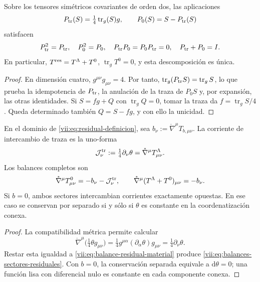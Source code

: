 \begin{proposition}
\label{vii:prop:proyectores-traza-residual}
Sobre los tensores simétricos covariantes de orden dos, las aplicaciones
\[
 P_{\rm tr}(S)=\tfrac14\operatorname{tr}_g(S)g,
 \qquad P_0(S)=S-P_{\rm tr}(S)
\]
satisfacen
\begin{equation}
 P_{\rm tr}^2=P_{\rm tr},\quad P_0^2=P_0,\quad
 P_{\rm tr}P_0=P_0P_{\rm tr}=0,\quad P_{\rm tr}+P_0=I.
 \label{vii:eq:proyectores-traza-residual}
\end{equation}
En particular, \(T^{\rm res}=T^\Lambda+T^0\),
\(\operatorname{tr}_gT^0=0\), y esta descomposición es única.
\end{proposition}
\begin{proof}
En dimensión cuatro, \(g^{\mu\nu}g_{\mu\nu}=4\). Por tanto,
\(\operatorname{tr}_g(P_{\rm tr}S)=\operatorname{tr}_gS\), lo que
prueba la idempotencia de \(P_{\rm tr}\), la anulación de la traza
de \(P_0S\) y, por expansión, las otras identidades.
Si \(S=fg+Q\) con \(\operatorname{tr}_gQ=0\), tomar la traza
da \(f=\operatorname{tr}_gS/4\). Queda determinado también
\(Q=S-fg\), y con ello la unicidad.
\end{proof}

\begin{theorem}
\label{vii:thm:intercambio-traza-residual}
En el dominio de \eqref{vii:eq:residual-definicion}, sea
\(b_\nu:=\mathring\nabla^\mu T_{b,\mu\nu}\). La corriente
de intercambio de traza es la uno-forma
\begin{equation}
 \mathcal J^{\rm tr}_\nu
 :=\tfrac14\partial_\nu\theta
 =\mathring\nabla^\mu T^\Lambda_{\mu\nu}.
 \label{vii:eq:corriente-intercambio-traza}
\end{equation}
Los balances completos son
\begin{equation}
 \mathring\nabla^\mu T^0_{\mu\nu}
       =-b_\nu-\mathcal J^{\rm tr}_\nu,
 \qquad
 \mathring\nabla^\mu(T^\Lambda+T^0)_{\mu\nu}=-b_\nu.
 \label{vii:eq:balances-sectores-residuales}
\end{equation}
Si \(b=0\), ambos sectores intercambian corrientes exactamente opuestas.
En ese caso se conservan por separado si y sólo si \(\theta\) es
constante en la coordenatización conexa.
\end{theorem}
\begin{proof}
La compatibilidad métrica permite calcular
\[
 \mathring\nabla^\mu\bigl(\tfrac14\theta g_{\mu\nu}\bigr)
 =\tfrac14g^{\mu\alpha}(\partial_\alpha\theta)g_{\mu\nu}
 =\tfrac14\partial_\nu\theta.
\]
Restar esta igualdad a \eqref{vii:eq:balance-residual-material} produce
\eqref{vii:eq:balances-sectores-residuales}. Con \(b=0\), la
conservación separada equivale a \(\mathrm d\theta=0\); una función
lisa con diferencial nulo es constante en cada componente conexa.
\end{proof}

